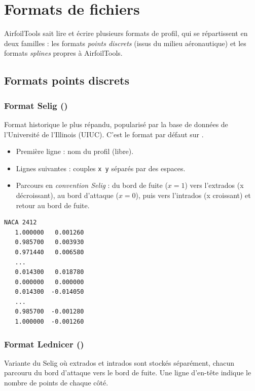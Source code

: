 \chapter{Formats de fichiers}
\label{chap:formats}

AirfoilTools sait lire et écrire plusieurs formats de profil, qui
se répartissent en deux familles : les formats \emph{points
discrets} (issus du milieu aéronautique) et les formats
\emph{splines} propres à AirfoilTools.

\section{Formats points discrets}

\subsection{Format Selig ()}

Format historique le plus répandu, popularisé par la base de
données de l'Université de l'Illinois (UIUC). C'est le format
par défaut sur .

\begin{itemize}
    \item Première ligne : nom du profil (libre).
    \item Lignes suivantes : couples \texttt{x y} séparés par
        des espaces.
    \item Parcours en \emph{convention Selig} : du bord de fuite
        ($x=1$) vers l'extrados (x décroissant), au bord
        d'attaque ($x=0$), puis vers l'intrados (x croissant)
        et retour au bord de fuite.
\end{itemize}

\begin{lstlisting}[caption={Exemple de fichier Selig (NACA~2412)}]
NACA 2412
   1.000000   0.001260
   0.985700   0.003930
   0.971440   0.006580
   ...
   0.014300   0.018780
   0.000000   0.000000
   0.014300  -0.014050
   ...
   0.985700  -0.001280
   1.000000  -0.001260
\end{lstlisting}

\subsection{Format Lednicer ()}

Variante du Selig où extrados et intrados sont stockés
séparément, chacun parcouru du bord d'attaque vers le bord de
fuite. Une ligne d'en-tête indique le nombre de points de chaque
côté.

